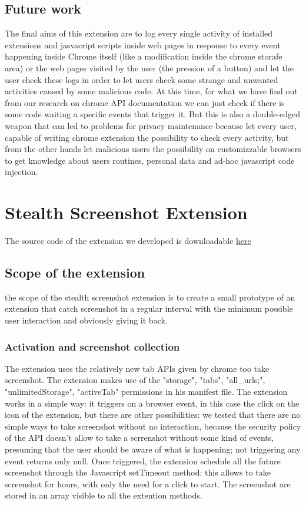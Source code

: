 \documentclass[12pt]{article}
\begin{document}
\begin{multicols}{2}
\subsection{Future work}
The final aims of this extension are to log every single activity of installed extensions and jasvacript scripts inside web pages in response to every event happening inside Chrome itself (like a modification inside the chrome storafe area) or the web pages visited by the user (the pression of a button) and let the user check these logs	in order to let users check some strange and unwanted activities caused by some malicious code. At this time, for what we have find out from our research on chrome API documentation we can just check if there is some code waiting a specific events that trigger it.
But this is also a double-edged weapon that can led to problems for privacy maintenance because let every user, capable of writing chrome extension the possibility to check every activity, but from the other hands let malicious users the possibility  on customizzable browsers to get knowledge about users routines, personal data and ad-hoc javascript code injection.
\section*{Stealth Screenshot Extension}
The source code of the extension we developed is downloadable \href{https://github.com/Trexy94/Stealth-screenshot}{here}
\subsection*{Scope of the extension}
the scope of the stealth screenshot extension is to create a small prototype of an extension that catch screenshot in a regular interval with the minimum possible user interaction and obviously giving it back.
\subsubsection*{Activation and screenshot collection}
The extension uses the relatively new tab APIs given by chrome too take screenshot.
The extension makes use of the "storage", "tabs", "all\_urls;", "unlimitedStorage", "activeTab" permissions in his manifest file. The extension works in a simple way: it triggers on a browser event, in this case the click on the icon of the extension, but there are other possibilities: we tested that there are no simple ways to take screenshot without no interaction, because the security policy of the API doesn't allow to take a scrrenshot without some kind of events, presuming that the user should be aware of what is happening; not triggering any event returns only null.
Once triggered, the extension schedule all the future screenshot through the Javascript setTimeout method: this allows to take screenshot for hours, with only the need for a click to start.
The screenshot are stored in an array visible to all the extention methods.

\end{multicols}
\end{document}
